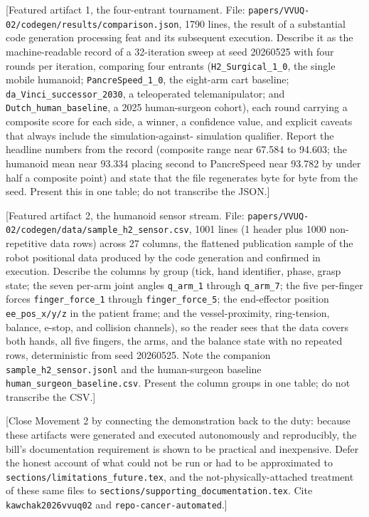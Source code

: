 [Featured artifact 1, the four-entrant tournament. File:
\texttt{papers/VVUQ-02/codegen/results/comparison.json}, 1790 lines, the result
of a substantial code generation processing feat and its subsequent execution.
Describe it as the machine-readable record of a 32-iteration sweep at seed
20260525 with four rounds per iteration, comparing four entrants
(\texttt{H2\_Surgical\_1\_0}, the single mobile humanoid; \texttt{PancreSpeed\_1\_0},
the eight-arm cart baseline; \texttt{da\_Vinci\_successor\_2030}, a teleoperated
telemanipulator; and \texttt{Dutch\_human\_baseline}, a 2025 human-surgeon
cohort), each round carrying a composite score for each side, a winner, a
confidence value, and explicit caveats that always include the simulation-against-
simulation qualifier. Report the headline numbers from the record (composite range
near 67.584 to 94.603; the humanoid mean near 93.334 placing second to PancreSpeed
near 93.782 by under half a composite point) and state that the file regenerates
byte for byte from the seed. Present this in one table; do not transcribe the
JSON.]

[Featured artifact 2, the humanoid sensor stream. File:
\texttt{papers/VVUQ-02/codegen/data/sample\_h2\_sensor.csv}, 1001 lines (1 header
plus 1000 non-repetitive data rows) across 27 columns, the flattened publication
sample of the robot positional data produced by the code generation and confirmed
in execution. Describe the columns by group (tick, hand identifier, phase, grasp
state; the seven per-arm joint angles \texttt{q\_arm\_1} through \texttt{q\_arm\_7};
the five per-finger forces \texttt{finger\_force\_1} through
\texttt{finger\_force\_5}; the end-effector position \texttt{ee\_pos\_x/y/z} in the
patient frame; and the vessel-proximity, ring-tension, balance, e-stop, and
collision channels), so the reader sees that the data covers both hands, all five
fingers, the arms, and the balance state with no repeated rows, deterministic from
seed 20260525. Note the companion \texttt{sample\_h2\_sensor.jsonl} and the
human-surgeon baseline \texttt{human\_surgeon\_baseline.csv}. Present the column
groups in one table; do not transcribe the CSV.]

[Close Movement 2 by connecting the demonstration back to the duty: because these
artifacts were generated and executed autonomously and reproducibly, the bill's
documentation requirement is shown to be practical and inexpensive. Defer the
honest account of what could not be run or had to be approximated to
\texttt{sections/limitations\_future.tex}, and the not-physically-attached
treatment of these same files to \texttt{sections/supporting\_documentation.tex}.
Cite \texttt{kawchak2026vvuq02} and \texttt{repo-cancer-automated}.]
